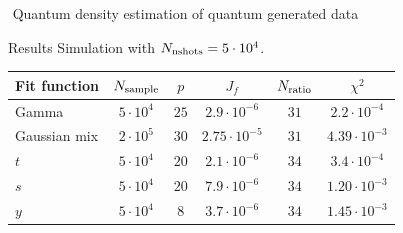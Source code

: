 \documentclass[20pt, final]{beamer}
\newlength{\colwidth}
\begin{document}
\begin{frame}[t]
\begin{columns}[t]
\begin{column}{\colwidth}
\begin{block}{\faMagic\,\,Quantum density estimation of quantum generated data}
\begin{alertblock}{Results}
Simulation with $N_{\rm nshots}=5\cdot 10^4$.
\vspace{1cm}
  \begin{center}
  \begin{tabular}{lccccc}
  \hline \hline
    Fit function & $N_{\rm sample}$ & $p$ & $J_f$ & $N_{\rm ratio}$ & $\chi^2$\\
  \hline
    Gamma & $5 \cdot 10^4$ & $25$ & $2.9 \cdot 10^{-6}$ & $31$ & $2.2\cdot10^{-4}$ \\
    Gaussian mix & $2 \cdot 10^5$ & $30$ & $2.75 \cdot 10^{-5}$ & $31$ & $4.39 \cdot 10^{-3}$ \\
    $t$ & $5\cdot 10^4$ & $20$ & $2.1 \cdot 10^{-6}$ & $34$ & $3.4 \cdot 10^{-4}$ \\
    $s$ & $5\cdot 10^4$ & $20$ & $7.9 \cdot 10^{-6}$ & $34$ & $1.20 \cdot 10^{-3}$\\
    $y$ & $5\cdot 10^4$ & $8$ & $3.7 \cdot 10^{-6}$ & $34$ & $1.45 \cdot 10^{-3}$\\
  \hline \hline
  \end{tabular}
\end{center}

  \end{alertblock}

  \end{block}


\end{column}
\end{columns}
\end{frame}
\end{document}
